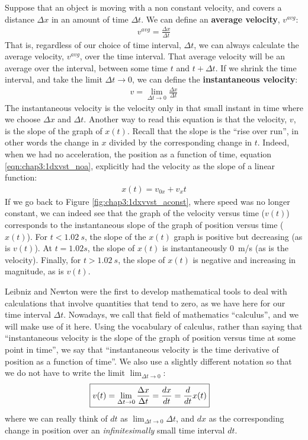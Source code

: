 Suppose that an object is moving with a non constant velocity, and covers a distance $\Delta x$ in an amount of time $\Delta t$. We can define an \textbf{average velocity}, $v^{avg}$:
\begin{align*}
v^{avg}= \frac{\Delta x}{\Delta t}
\end{align*}
That is, regardless of our choice of time interval, $\Delta t$, we can always calculate the average velocity, $v^{avg}$, over the time interval. That average velocity will be an average over the interval, between some time $t$ and $t+\Delta t$. If we shrink the time interval, and take the limit $\Delta t\to 0$, we can define the \textbf{instantaneous velocity}:
\begin{align*}
v = \lim_{\Delta t\to 0} \frac{\Delta x}{\Delta t}
\end{align*}
The instantaneous velocity is the velocity only in that small instant in time where we choose $\Delta x$ and $\Delta t$. Another way to read this equation is that the velocity, $v$, is the slope of the graph of $x(t)$. Recall that the slope is the ``rise over run'', in other words the change in $x$ divided by the corresponding change in $t$. Indeed, when we had no acceleration, the position as a function of time, equation \ref{eqn:chap3:1dxvst_noa}, explicitly had the velocity as the slope of a linear function:
 \begin{align*}
 x(t) = v_{0x}+v_xt
 \end{align*}
 If we go back to Figure \ref{fig:chap3:1dxvvst_aconst}, where speed was no longer constant, we can indeed see that the graph of the velocity versus time ($v(t)$) corresponds to the instantaneous slope of the graph of position versus time ($x(t)$). For $t<\SI{1.02}{s}$, the slope of the $x(t)$ graph is positive but decreasing (as is $v(t)$). At $t=\SI{1}.02{s}$, the slope of $x(t)$ is instantaneously \SI{0}{m/s} (as is the velocity). Finally, for $t>\SI{1.02}{s}$, the slope of $x(t)$ is negative and increasing in magnitude, as is $v(t)$.

Leibniz and Newton were the first to develop mathematical tools to deal with calculations that involve quantities that tend to zero, as we have here for our time interval $\Delta t$. Nowadays, we call that field of mathematics ``calculus'', and we will make use of it here. Using the vocabulary of calculus, rather than saying that ``instantaneous velocity is the slope of the graph of position versus time at some point in time'', we say that ``instantaneous velocity is the time derivative of position as a function of time''. We also use a slightly different notation so that we do not have to write the limit $\lim_{\Delta t\to 0}$:
\begin{align}
\label{eqn:chap3:vdef}
\Aboxed{v(t)=\lim_{\Delta t\to 0} \frac{\Delta x}{\Delta t}=\frac{dx}{dt}=\frac{d}{dt} x(t)}
\end{align}
where we can really think of $dt$ as $\lim_{\Delta t\to 0}\Delta t$, and $dx$ as the corresponding change in position over an \textit{infinitesimally} small time interval $dt$.

